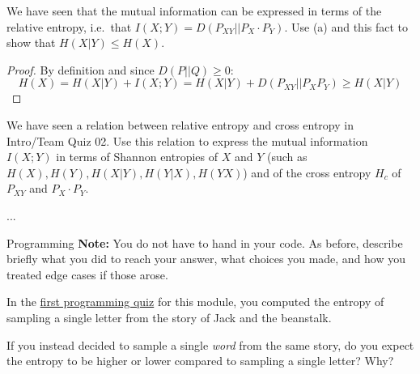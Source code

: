 \documentclass[a4paper,10pt]{article}
\begin{document}
\begin{subproblem}{1}
We have seen that the mutual information can be expressed in
        terms of the relative entropy, i.e.\ that $I(X;Y) =
        D(P_{XY}||P_X \cdot P_Y)$. Use (a) and this fact to show that $H(X|Y) \leq H(X)$.
\end{subproblem}

\begin{solution}
  \begin{proof}
    By definition and since $D(P||Q)\ge 0$:
    \begin{equation}
      \label{eq:6}
      H(X) = H(X|Y) + I(X;Y) = H(X|Y) + D(P_{XY}||P_{X}P_{Y}) \ge H(X|Y)
    \end{equation}
  \end{proof}
\end{solution}

\begin{subproblem}{2}
We have seen a relation between relative entropy and cross
        entropy in Intro/Team Quiz 02. Use this relation to express
        the mutual information $I(X;Y)$ in terms of Shannon entropies
        of $X$ and $Y$ (such as $H(X), H(Y), H(X|Y), H(Y|X), H(YX)$) and of the cross entropy $H_c$ of $P_{XY}$ and $P_X
        \cdot P_Y$.
\end{subproblem}

\begin{solution}
...
\end{solution}









\begin{nproblem}{8}{Programming}
	\textbf{Note:} You do not have to hand in your code. As before, describe briefly what you did to reach your answer, what choices you made, and how you treated edge cases if those arose.
\end{nproblem}

\begin{subproblem}{1}
In the \href{https://canvas.uva.nl/courses/10933/assignments/72716}{first programming quiz} for this module, you computed the entropy of sampling a single letter from the story of Jack and the beanstalk.

If you instead decided to sample a single \emph{word} from the same story, do you expect the entropy to be higher or lower compared to sampling a single letter? Why?
\end{subproblem}
\end{document}
